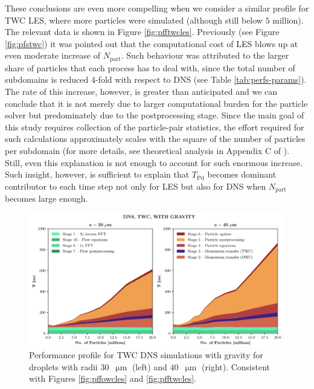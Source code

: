 \documentclass{pracamgren}
\begin{document}
These conclusions are even more compelling when we consider a similar profile for TWC LES, where more particles were simulated (although still below $5$ million).
The relevant data is shown in Figure \ref{fig:pfftwcles}.
Previously (see Figure \ref{fig:pfstwc}) it was pointed out that the computational cost of LES blows up at even moderate increase of $N_{\text{part}}$.
Such behaviour was attributed to the larger share of particles that each process has to deal with, since the total number of subdomains is reduced $4$-fold with respect to DNS (see Table \ref{tab:perfs-params}).
The rate of this increase, however, is greater than anticipated and we can conclude that it is not merely due to larger computational burden for the particle solver but predominately due to the postprocessing stage.
Since the main goal of this study requires collection of the particle-pair statistics, the effort required for such calculations approximately scales with the square of the number of particles per subdomain (for more details, see theoretical analysis in Appendix C of \textcite{Ayala2014}).
Still, even this explanation is not enough to account for such enormous increase.
Such insight, however, is sufficient to explain that $T_{\text{Pd}}$ becomes dominant contributor to each time step not only for LES but also for DNS when $N_{\text{part}}$ becomes large enough.

\begin{figure}[h]
\centering
\includegraphics[width=13.5cm]{figures/3-09_pfftwcdns.pdf}
\caption{
Performance profile for TWC DNS simulations with gravity for droplets with radii $30$~$\upmu\text{m}$ (left) and $40$~$\upmu\text{m}$ (right).
Consistent with Figures \ref{fig:pffowcles} and \ref{fig:pfftwcles}.
}
\label{fig:pfftwcdns}
\end{figure}
\end{document}
